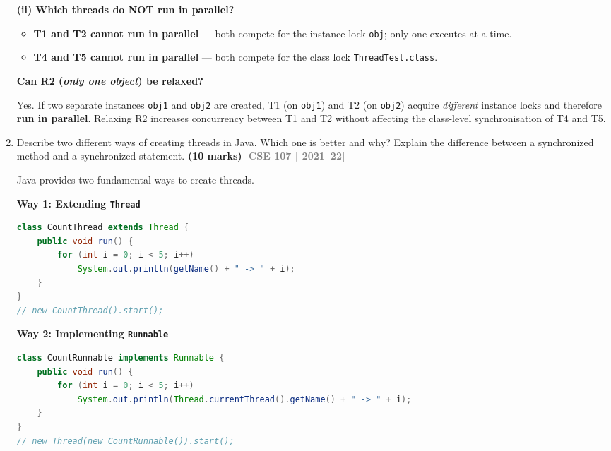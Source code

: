 \documentclass[12pt,a3paper]{article}
\newcommand{\yr}[1]{\hfill\textcolor{gray}{\small\textbf{[#1]}}}
\newcommand{\mk}[1]{\textcolor{orange!70!black}{\small\textbf{(#1 marks)}}}
\begin{document}
\begin{enumerate}
\begin{tcolorbox}
\textbf{(ii) Which threads do NOT run in parallel?}
\begin{itemize}[itemsep=2pt]
  \item \textbf{T1 and T2 cannot run in parallel} --- both compete
    for the instance lock \texttt{obj}; only one executes at a time.
  \item \textbf{T4 and T5 cannot run in parallel} --- both compete
    for the class lock \texttt{ThreadTest.class}.
\end{itemize}

\medskip
\textbf{Can R2 (\emph{only one object}) be relaxed?}

Yes.  If two separate instances \texttt{obj1} and \texttt{obj2} are
created, T1 (on \texttt{obj1}) and T2 (on \texttt{obj2}) acquire
\emph{different} instance locks and therefore \textbf{run in
parallel}.  Relaxing R2 increases concurrency between T1 and T2
without affecting the class-level synchronisation of T4 and T5.

\end{tcolorbox}

\item Describe two different ways of creating threads in Java. Which one is better and why? Explain the difference between a synchronized method and a synchronized statement. \mk{10}
\yr{CSE 107 | 2021--22}

\begin{tcolorbox}[enhanced,breakable,ansbox,
  colback=cF!4,colframe=cF,boxrule=0.8pt,arc=5pt,
  title={\textbf{Answer — Thread Creation, Preference \& Synchronization}},
  fonttitle=\bfseries\color{white},colbacktitle=cF]

Java provides two fundamental ways to create threads.

\medskip
\textbf{Way 1: Extending \texttt{Thread}}
\begin{lstlisting}[language=Java]
class CountThread extends Thread {
    public void run() {
        for (int i = 0; i < 5; i++)
            System.out.println(getName() + " -> " + i);
    }
}
// new CountThread().start();
\end{lstlisting}

\medskip
\textbf{Way 2: Implementing \texttt{Runnable}}
\begin{lstlisting}[language=Java]
class CountRunnable implements Runnable {
    public void run() {
        for (int i = 0; i < 5; i++)
            System.out.println(Thread.currentThread().getName() + " -> " + i);
    }
}
// new Thread(new CountRunnable()).start();
\end{lstlisting}


\end{tcolorbox}
\end{enumerate}
\end{document}
